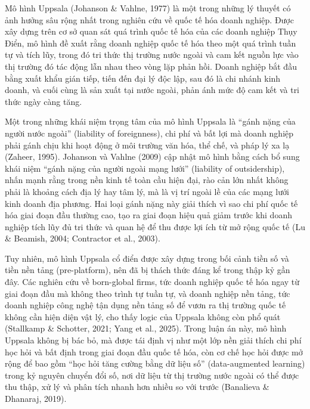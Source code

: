 \documentclass[
  a4paper,
  13pt]{extreport}
\begin{document}
Mô hình Uppsala (Johanson \& Vahlne, 1977) là một trong những lý thuyết
có ảnh hưởng sâu rộng nhất trong nghiên cứu về quốc tế hóa doanh nghiệp.
Được xây dựng trên cơ sở quan sát quá trình quốc tế hóa của các doanh
nghiệp Thụy Điển, mô hình đề xuất rằng doanh nghiệp quốc tế hóa theo một
quá trình tuần tự và tích lũy, trong đó tri thức thị trường nước ngoài
và cam kết nguồn lực vào thị trường đó tác động lẫn nhau theo vòng lặp
phản hồi. Doanh nghiệp bắt đầu bằng xuất khẩu gián tiếp, tiến đến đại lý
độc lập, sau đó là chi nhánh kinh doanh, và cuối cùng là sản xuất tại
nước ngoài, phản ánh mức độ cam kết và tri thức ngày càng tăng.

Một trong những khái niệm trọng tâm của mô hình Uppsala là ``gánh nặng
của người nước ngoài'' (liability of foreignness), chi phí và bất lợi mà
doanh nghiệp phải gánh chịu khi hoạt động ở môi trường văn hóa, thể chế,
và pháp lý xa lạ (Zaheer, 1995). Johanson và Vahlne (2009) cập nhật mô
hình bằng cách bổ sung khái niệm ``gánh nặng của người ngoài mạng lưới''
(liability of outsidership), nhấn mạnh rằng trong nền kinh tế toàn cầu
hiện đại, rào cản lớn nhất không phải là khoảng cách địa lý hay tâm lý,
mà là vị trí ngoài lề của các mạng lưới kinh doanh địa phương. Hai loại
gánh nặng này giải thích vì sao chi phí quốc tế hóa giai đoạn đầu thường
cao, tạo ra giai đoạn hiệu quả giảm trước khi doanh nghiệp tích lũy đủ
tri thức và quan hệ để thu được lợi ích từ mở rộng quốc tế (Lu \&
Beamish, 2004; Contractor et al., 2003).

Tuy nhiên, mô hình Uppsala cổ điển được xây dựng trong bối cảnh tiền số
và tiền nền tảng (pre-platform), nên đã bị thách thức đáng kể trong thập
kỷ gần đây. Các nghiên cứu về born-global firms, tức doanh nghiệp quốc
tế hóa ngay từ giai đoạn đầu mà không theo trình tự tuần tự, và doanh
nghiệp nền tảng, tức doanh nghiệp công nghệ tận dụng nền tảng số để vươn
ra thị trường quốc tế không cần hiện diện vật lý, cho thấy logic của
Uppsala không còn phổ quát (Stallkamp \& Schotter, 2021; Yang et al.,
2025). Trong luận án này, mô hình Uppsala không bị bác bỏ, mà được tái
định vị như một lớp nền giải thích chi phí học hỏi và bất định trong
giai đoạn đầu quốc tế hóa, còn cơ chế học hỏi được mở rộng để bao gồm
``học hỏi tăng cường bằng dữ liệu số'' (data-augmented learning) trong
kỷ nguyên chuyển đổi số, nơi dữ liệu từ thị trường nước ngoài có thể
được thu thập, xử lý và phân tích nhanh hơn nhiều so với trước
(Banalieva \& Dhanaraj, 2019).
\end{document}
